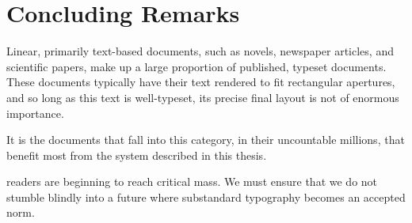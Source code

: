 \section{Concluding Remarks}

Linear, primarily text-based documents, such as novels, newspaper articles, and scientific papers, make up a large proportion of published, typeset documents. These documents typically have their text rendered to fit rectangular apertures, and so long as this text is well-typeset, its precise final layout is not of enormous importance.

\vspace{0.4in}

It is the documents that fall into this category, in their uncountable millions, that benefit most from the system described in this thesis.

\vspace{0.4in}

\noindent
\Ebook{} readers are beginning to reach critical mass. We must ensure that we do not stumble blindly into a future where substandard typography becomes an accepted norm.

